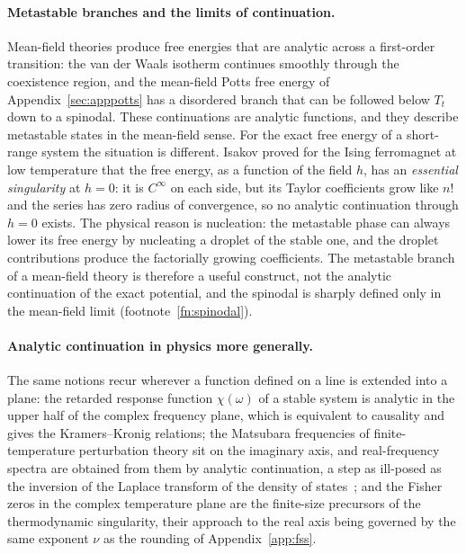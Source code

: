 \documentclass[10pt,a4paper]{article}
\theoremstyle{remark}
\begin{document}
\paragraph{Metastable branches and the limits of continuation.} Mean-field
theories produce free energies that are analytic across a first-order
transition: the van der Waals isotherm continues smoothly through the
coexistence region, and the mean-field Potts free energy of
Appendix~\ref{sec:apppotts} has a disordered branch that can be followed
below $T_t$ down to a spinodal. These continuations are analytic functions,
and they describe metastable states in the mean-field sense. For the exact
free energy of a short-range system the situation is different. Isakov
\cite{Isakov} proved for the Ising ferromagnet at low temperature that the free
energy, as a function of the field $h$, has an \emph{essential singularity} at
$h=0$: it is $C^{\infty}$ on each side, but its Taylor coefficients grow like
$n!$ and the series has zero radius of convergence, so no analytic continuation
through $h=0$ exists. The physical reason is nucleation: the metastable phase
can always lower its free energy by nucleating a droplet of the stable one,
and the droplet contributions produce the factorially growing coefficients.
The metastable branch of a mean-field theory is therefore a useful construct,
not the analytic continuation of the exact potential, and the spinodal is
sharply defined only in the mean-field limit (footnote~\ref{fn:spinodal}).

\paragraph{Analytic continuation in physics more generally.} The same notions
recur wherever a function defined on a line is extended into a plane: the
retarded response function $\chi(\omega)$ of a stable system is analytic in
the upper half of the complex frequency plane, which is equivalent to
causality and gives the Kramers--Kronig relations; the Matsubara frequencies
of finite-temperature perturbation theory sit on the imaginary axis, and
real-frequency spectra are obtained from them by analytic continuation, a step
as ill-posed as the inversion of the Laplace transform of the density of
states~\cite{DOSNotes}; and the Fisher zeros in the complex
temperature plane are the finite-size precursors of the thermodynamic
singularity, their approach to the real axis being governed by the same
exponent $\nu$ as the rounding of Appendix~\ref{app:fss}.
\end{document}

